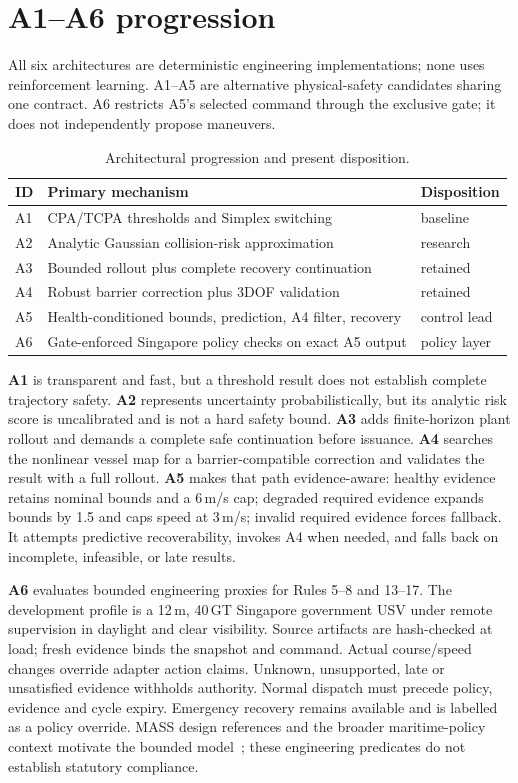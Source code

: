 \documentclass[sigconf,nonacm]{acmart}
\begin{document}
\section{A1--A6 progression}
All six architectures are deterministic engineering implementations; none uses reinforcement learning. A1--A5 are alternative physical-safety candidates sharing one contract. A6 restricts A5's selected command through the exclusive gate; it does not independently propose maneuvers.

\begin{table}[t]
\centering
\caption{Architectural progression and present disposition.}
\label{tab:architectures}
\scriptsize
\begin{tabularx}{\columnwidth}{@{}lXl@{}}
\toprule
ID & Primary mechanism & Disposition\\
\midrule
A1 & CPA/TCPA thresholds and Simplex switching & baseline\\
A2 & Analytic Gaussian collision-risk approximation & research\\
A3 & Bounded rollout plus complete recovery continuation & retained\\
A4 & Robust barrier correction plus 3DOF validation & retained\\
A5 & Health-conditioned bounds, prediction, A4 filter, recovery & control lead\\
A6 & Gate-enforced Singapore policy checks on exact A5 output & policy layer\\
\bottomrule
\end{tabularx}
\end{table}

\textbf{A1} is transparent and fast, but a threshold result does not establish complete trajectory safety. \textbf{A2} represents uncertainty probabilistically, but its analytic risk score is uncalibrated and is not a hard safety bound. \textbf{A3} adds finite-horizon plant rollout and demands a complete safe continuation before issuance. \textbf{A4} searches the nonlinear vessel map for a barrier-compatible correction and validates the result with a full rollout. \textbf{A5} makes that path evidence-aware: healthy evidence retains nominal bounds and a 6\,m/s cap; degraded required evidence expands bounds by 1.5 and caps speed at 3\,m/s; invalid required evidence forces fallback. It attempts predictive recoverability, invokes A4 when needed, and falls back on incomplete, infeasible, or late results.

\textbf{A6} evaluates bounded engineering proxies for Rules 5--8 and 13--17. The development profile is a 12\,m, 40\,GT Singapore government USV under remote supervision in daylight and clear visibility. Source artifacts are hash-checked at load; fresh evidence binds the snapshot and command. Actual course/speed changes override adapter action claims. Unknown, unsupported, late or unsatisfied evidence withholds authority. Normal dispatch must precede policy, evidence and cycle expiry. Emergency recovery remains available and is labelled as a policy override. MASS design references and the broader maritime-policy context motivate the bounded model~\cite{imo-colreg,imo-mass,rsn-usv}; these engineering predicates do not establish statutory compliance.
\end{document}
